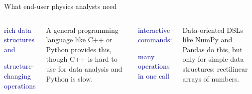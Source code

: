\documentclass[aspectratio=169]{beamer}
\begin{document}

\begin{frame}{What end-user physics analysts need}
\Large
\vspace{0.25 cm}

\begin{columns}
\begin{center}
\textcolor{darkblue}{rich data structures and}

\textcolor{darkblue}{structure-changing operations}
\end{center}

\vspace{0.25 cm}
A general programming language like C++ or Python provides this, though C++ is hard to use for data analysis and Python is slow.

\begin{center}
\textcolor{darkblue}{interactive commands:}

\textcolor{darkblue}{many operations in one call}
\end{center}

\vspace{0.25 cm}
Data-oriented DSLs like NumPy and Pandas do this, but only for simple data structures: rectilinear arrays of numbers.
\end{columns}



\end{frame}
\end{document}
